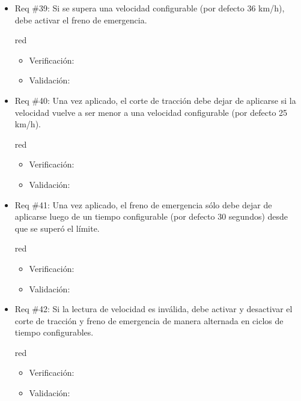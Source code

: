 \documentclass[11pt]{charter}
\begin{document}
\begin{itemize}
\item Req \#39: Si se supera una velocidad configurable (por defecto 36 km/h), debe activar el freno de emergencia.
\begin{consigna}{red}
\begin{itemize}
  \item Verificación:\\
  \item Validación:\\
\end{itemize}
\end{consigna}

\item Req \#40: Una vez aplicado, el corte de tracción debe dejar de aplicarse si la velocidad vuelve a ser menor a una velocidad configurable (por defecto 25 km/h).
\begin{consigna}{red}
\begin{itemize}
  \item Verificación:\\
  \item Validación:\\
\end{itemize}
\end{consigna}

\item Req \#41: Una vez aplicado, el freno de emergencia sólo debe dejar de aplicarse luego de un tiempo configurable (por defecto 30 segundos) desde que se superó el límite.
\begin{consigna}{red}
\begin{itemize}
  \item Verificación:\\
  \item Validación:\\
\end{itemize}
\end{consigna}

\item Req \#42: Si la lectura de velocidad es inválida, debe activar y desactivar el corte de tracción y freno de emergencia de manera alternada en ciclos de tiempo configurables.
\begin{consigna}{red}
\begin{itemize}
  \item Verificación:\\
  \item Validación:\\
\end{itemize}
\end{consigna}


\end{itemize}
\end{document}
